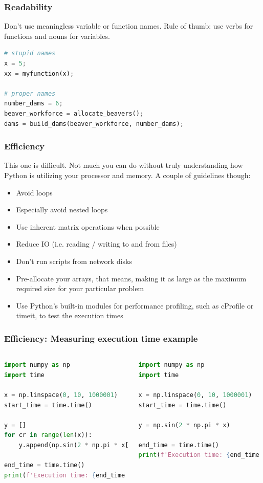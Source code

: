 \begin{frame}[fragile]
  \frametitle{Readability}
  Don't use meaningless variable or function names. Rule of thumb: use verbs for functions and nouns for variables.
  \vspace*{2em}
  \begin{lstlisting}[language=Python]
# stupid names
x = 5;
xx = myfunction(x);

# proper names
number_dams = 6;
beaver_workforce = allocate_beavers();
dams = build_dams(beaver_workforce, number_dams);
  \end{lstlisting}
\end{frame}

\begin{frame}[fragile]
  \frametitle{Efficiency}
  This one is difficult. Not much you can do without truly understanding how Python is utilizing your processor and memory. A couple of guidelines though:
  \begin{itemize}
      \item Avoid loops
      \item Especially avoid nested loops
      \item Use inherent matrix operations when possible
      \item Reduce IO (i.e. reading / writing to and from files)
      \item Don't run scripts from network disks
      \item Pre-allocate your arrays, that means, making it as large as the maximum required size for your particular problem
      \item Use Python's built-in modules for performance profiling, such as cProfile or timeit, to test the execution times
  \end{itemize}
\end{frame}

\begin{frame}[fragile]
  \frametitle{Efficiency: Measuring execution time example}
  \begin{columns}
    \begin{lstlisting}[language=Python]
import numpy as np
import time

x = np.linspace(0, 10, 1000001)
start_time = time.time()

y = []
for cr in range(len(x)):
    y.append(np.sin(2 * np.pi * x[cr]))

end_time = time.time()
print(f'Execution time: {end_time - start_time} seconds')
    \end{lstlisting}
    \begin{lstlisting}[language=Python]
import numpy as np
import time

x = np.linspace(0, 10, 1000001)
start_time = time.time()

y = np.sin(2 * np.pi * x)

end_time = time.time()
print(f'Execution time: {end_time - start_time} seconds')
    \end{lstlisting}
  \end{columns}
\end{frame}


